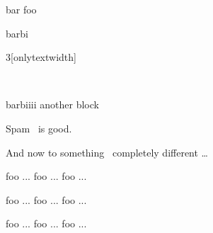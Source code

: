 \documentclass[final]{beamer}
\begin{document}
\begin{frame}[t]

\begin{block}
\maketitle
\end{block}

\begin{block}{bar}
foo

\end{block}


\begin{block}{barbi}
\end{block}

\begin{multicols}{3}[onlytextwidth]

\hrulefill\\

\begin{block}{barbiiii}
another block
\end{block}

Spam~ is good.
\lipsum[0]


And now to something~\cite{guo2017improved} completely different \dots


foo ...
foo ...
foo ...

foo ...
foo ...
foo ...

\lipsum[1]
foo ...
foo ...
foo ...


\end{multicols}
\end{frame}
\end{document}
